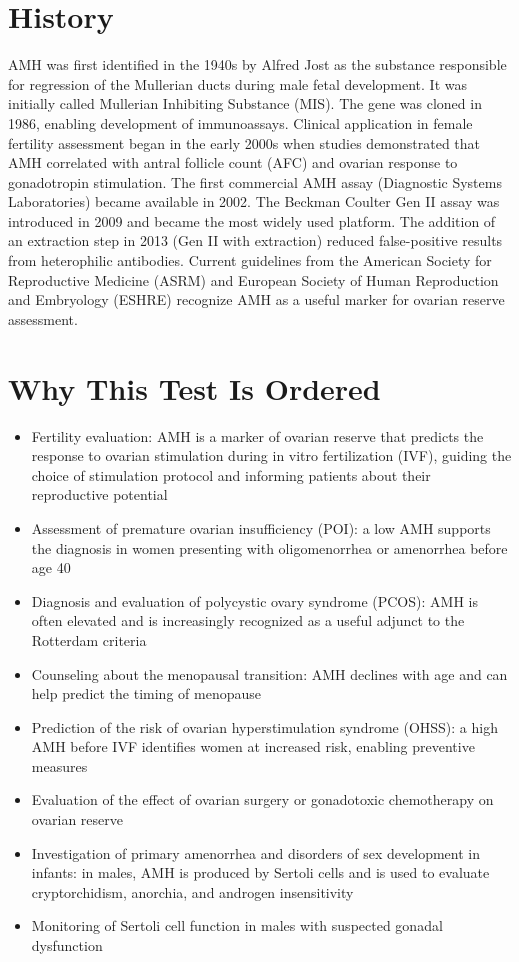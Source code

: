 \section*{History}
AMH was first identified in the 1940s by Alfred Jost as the substance responsible for regression of the Mullerian ducts during male fetal development. It was initially called Mullerian Inhibiting Substance (MIS). The gene was cloned in 1986, enabling development of immunoassays. Clinical application in female fertility assessment began in the early 2000s when studies demonstrated that AMH correlated with antral follicle count (AFC) and ovarian response to gonadotropin stimulation. The first commercial AMH assay (Diagnostic Systems Laboratories) became available in 2002. The Beckman Coulter Gen II assay was introduced in 2009 and became the most widely used platform. The addition of an extraction step in 2013 (Gen II with extraction) reduced false-positive results from heterophilic antibodies. Current guidelines from the American Society for Reproductive Medicine (ASRM) and European Society of Human Reproduction and Embryology (ESHRE) recognize AMH as a useful marker for ovarian reserve assessment.

\section*{Why This Test Is Ordered}
\begin{itemize}
  \item Fertility evaluation: AMH is a marker of ovarian reserve that predicts the response to ovarian stimulation during in vitro fertilization (IVF), guiding the choice of stimulation protocol and informing patients about their reproductive potential
  \item Assessment of premature ovarian insufficiency (POI): a low AMH supports the diagnosis in women presenting with oligomenorrhea or amenorrhea before age 40
  \item Diagnosis and evaluation of polycystic ovary syndrome (PCOS): AMH is often elevated and is increasingly recognized as a useful adjunct to the Rotterdam criteria
  \item Counseling about the menopausal transition: AMH declines with age and can help predict the timing of menopause
  \item Prediction of the risk of ovarian hyperstimulation syndrome (OHSS): a high AMH before IVF identifies women at increased risk, enabling preventive measures
  \item Evaluation of the effect of ovarian surgery or gonadotoxic chemotherapy on ovarian reserve
  \item Investigation of primary amenorrhea and disorders of sex development in infants: in males, AMH is produced by Sertoli cells and is used to evaluate cryptorchidism, anorchia, and androgen insensitivity
  \item Monitoring of Sertoli cell function in males with suspected gonadal dysfunction
\end{itemize}

